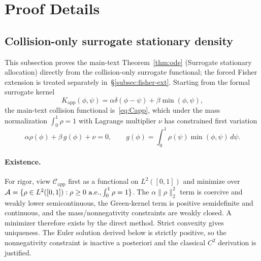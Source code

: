 \section{Proof Details}
\label{sec:proofs}

\subsection{Collision-only surrogate stationary density}

This subsection proves the main-text Theorem~\ref{thm:ode} (Surrogate stationary allocation) directly from the collision-only surrogate functional; the forced Fisher extension is treated separately in~\S\ref{subsec:fisher-ext}. Starting from the formal surrogate kernel
\begin{equation}
K_{\mathrm{app}}(\phi,\psi)=\alpha\delta(\phi-\psi)+\beta\min(\phi,\psi),
\end{equation}
the main-text collision functional is~\eqref{eq:Capp}, which under the mass normalization $\int_0^1\rho=1$ with Lagrange multiplier $\nu$ has constrained first variation
\begin{equation}
\alpha\rho(\phi) + \beta\,g(\phi) + \nu = 0,\qquad
g(\phi) = \int_0^1 \rho(\psi)\min(\phi,\psi)\,d\psi.
\end{equation}
\paragraph{Existence.}
For rigor, view $\mathcal{C}_{\mathrm{app}}$ first as a functional on $L^2([0,1])$ and minimize over $\mathcal{A}=\{\rho\in L^2([0,1]):\rho\ge0\ {\rm a.e.},\int_0^1\rho=1\}$. The $\alpha\|\rho\|_2^2$ term is coercive and weakly lower semicontinuous, the Green-kernel term is positive semidefinite and continuous, and the mass/nonnegativity constraints are weakly closed. A minimizer therefore exists by the direct method. Strict convexity gives uniqueness. The Euler solution derived below is strictly positive, so the nonnegativity constraint is inactive a posteriori and the classical $C^2$ derivation is justified.

